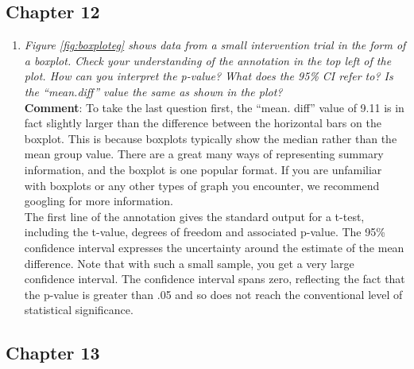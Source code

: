\documentclass{krantz}
\providecommand{\tightlist}{%
\setlength{\itemsep}{0pt}\setlength{\parskip}{0pt}}
\begin{document}
\hypertarget{chapter-12}{%
\subsection{Chapter 12}\label{chapter-12}}

\begin{enumerate}
\def\labelenumi{\arabic{enumi}.}
\tightlist
\item
  \emph{Figure \ref{fig:boxploteg} shows data from a small intervention trial in the form of a boxplot. Check your understanding of the annotation in the top left of the plot. How can you interpret the p-value? What does the 95\% CI refer to? Is the ``mean.diff'' value the same as shown in the plot?}\\
  \textbf{Comment}: To take the last question first, the ``mean. diff'' value of 9.11 is in fact slightly larger than the difference between the horizontal bars on the boxplot. This is because boxplots typically show the median rather than the mean group value. There are a great many ways of representing summary information, and the boxplot is one popular format. If you are unfamiliar with boxplots or any other types of graph you encounter, we recommend googling for more information.\\
  The first line of the annotation gives the standard output for a t-test, including the t-value, degrees of freedom and associated p-value. The 95\% confidence interval expresses the uncertainty around the estimate of the mean difference. Note that with such a small sample, you get a very large confidence interval. The confidence interval spans zero, reflecting the fact that the p-value is greater than .05 and so does not reach the conventional level of statistical significance.
\end{enumerate}

\hypertarget{chapter-13}{%
\subsection{Chapter 13}\label{chapter-13}}
\end{document}
